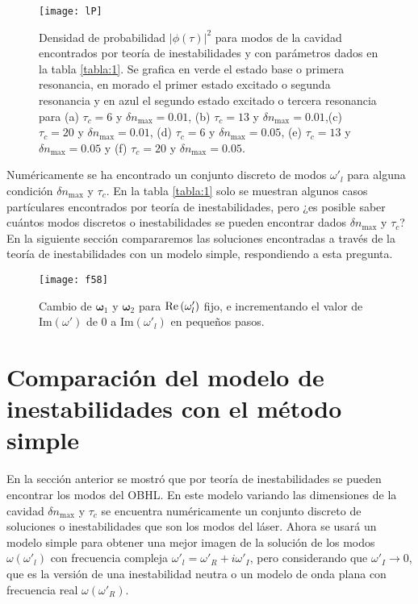 \begin{figure}\centering
	\texttt{[image: lP]}
	\caption{Densidad de probabilidad $|\phi
(\tau)|^2$ para modos de la cavidad encontrados por teor\'{i}a de inestabilidades y con par\'ametros dados en la tabla \ref{tabla:1}. Se grafica en verde el estado base o primera resonancia, en morado el primer estado excitado o segunda resonancia y en azul el segundo estado excitado o tercera resonancia para (a) $\tau_c=6$ y $\delta n_{\text{max}}=0.01$, (b) $\tau_c=13$ y $\delta n_{\text{max}}=0.01$,(c) $\tau_c=20$ y $\delta n_{\text{max}}=0.01$, (d) $\tau_c=6$ y $\delta n_{\text{max}}=0.05$, (e) $\tau_c=13$ y $\delta n_{\text{max}}=0.05$ y (f) $\tau_c=20$ y $\delta n_{\text{max}}=0.05$.} \label{fig:5.7B}
\end{figure}


Num\'{e}ricamente se ha encontrado un conjunto discreto de modos $\omega'_l$ para alguna condici\'{o}n $\delta n_{\text{max}}$ y $\tau_c$. En la tabla \ref{tabla:1} solo se muestran algunos casos part\'{i}culares encontrados por teor\'{i}a de inestabilidades, pero ¿es posible saber cu\'{a}ntos modos discretos o inestabilidades se pueden encontrar dados $\delta n_{\text{max}}$ y $\tau_c$? En la siguiente sección compararemos las soluciones encontradas a través de la teoría de
inestabilidades con un modelo simple, respondiendo a esta pregunta.

\begin{figure}\centering
	\texttt{[image: f58]}
	\caption{Cambio de $\bm{\omega}_1$ y $\bm{\omega}_2$ para $\text{\Re}(\omega'_l)$ fijo, e incrementando el valor de $\text{Im}(\omega')$ de $0$ a $\text{Im}(\omega'_l)$ en peque\~{n}os pasos.}\label{fig:5.8}
\end{figure}

\section{Comparaci\'{o}n del modelo de inestabilidades con el m\'{e}todo simple}
En la secci\'{o}n anterior se mostr\'{o} que por teor\'{i}a de inestabilidades se pueden encontrar los modos del OBHL. En este modelo variando las dimensiones de la cavidad $\delta n_{\text{max}}$  y $\tau_c$ se encuentra num\'{e}ricamente un conjunto discreto de soluciones o inestabilidades que son los modos del l\'{a}ser. Ahora se usar\'{a} un modelo simple para obtener una mejor imagen de la soluci\'{o}n de los modos $\omega(\omega'_l)$ con frecuencia compleja $\omega'_l=\omega'_R+i\omega'_I$, pero considerando que $\omega'_I\rightarrow 0$, que es la versi\'{o}n de una inestabilidad neutra o un modelo de onda plana con frecuencia real $\omega(\omega'_R)$.\\

